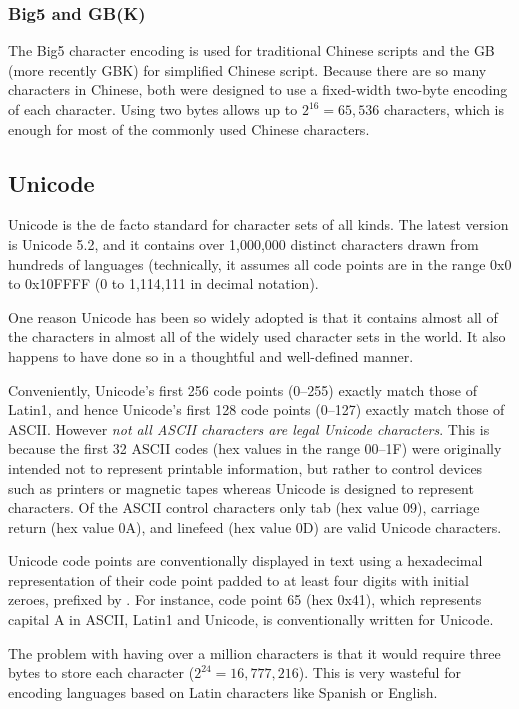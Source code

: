 \subsubsection{Big5 and GB(K)}

The Big5 character encoding is used for traditional Chinese scripts
and the GB (more recently GBK) for simplified Chinese script.  Because
there are so many characters in Chinese, both were designed to use a
fixed-width two-byte encoding of each character.  Using two bytes
allows up to $2^{16} = 65,536$ characters, which is enough for most
of the commonly used Chinese characters.

\subsection{Unicode}\label{section:unicode}

Unicode is the de facto standard for character sets of all kinds.  The
latest version is Unicode 5.2, and it contains over 1,000,000 distinct
characters drawn from hundreds of languages (technically, it assumes
all code points are in the range 0x0 to 0x10FFFF (0 to 1,114,111 in
decimal notation).

One reason Unicode has been so widely adopted is that it contains
almost all of the characters in almost all of the widely used
character sets in the world.  It also happens to have done so in a
thoughtful and well-defined manner.

Conveniently, Unicode's first 256 code points (0--255) exactly match
those of Latin1, and hence Unicode's first 128 code points (0--127)
exactly match those of ASCII.
However \emph{not all ASCII characters are legal Unicode characters}.
This is because the first 32 ASCII codes (hex values in the range 00--1F) 
were originally intended not to
represent printable information, but rather to control devices such as printers
or magnetic tapes whereas Unicode is designed to represent characters.
Of the ASCII control characters only tab (hex value 09), carriage return (hex value 0A), 
and linefeed (hex value 0D) are valid Unicode characters.

Unicode code points are conventionally displayed in text using a
hexadecimal representation of their code point padded to at least four
digits with initial zeroes, prefixed by .  For instance, code
point 65 (hex 0x41), which represents capital A in ASCII, Latin1 and
Unicode, is conventionally written  for Unicode.

The problem with having over a million characters is that it would
require three bytes to store each character ($2^{24} = 16,777,216$).
This is very wasteful for encoding languages based on Latin characters
like Spanish or English.

